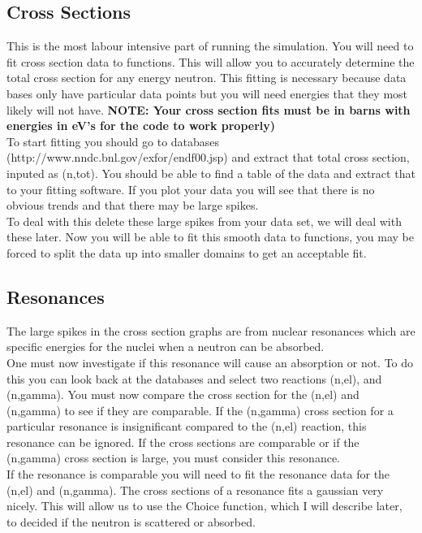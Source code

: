 \documentclass[12pt]{amsart}
\begin{document}
\subsection{Cross Sections}
This is the most labour intensive part of running the simulation. You will need to fit cross section data to functions. This will allow you to accurately determine the total cross section for any energy neutron. This fitting is necessary because data bases only have particular data points but you will need energies that they most likely will not have. \textbf{NOTE: Your cross section fits must be in barns with energies in eV's for the code to work properly)}\\
\indent To start fitting you should go to databases (http://www.nndc.bnl.gov/exfor/endf00.jsp) and extract that total cross section, inputed as (n,tot). You should be able to find a table of the data and extract that to your fitting software. If you plot your data you will see that there is no obvious trends and that there may be large spikes.\\
\indent To deal with this delete these large spikes from your data set, we will deal with these later. Now you will be able to fit this smooth data to functions, you may be forced to split the data up into smaller domains to get an acceptable fit.\\
\subsection{Resonances}
The large spikes in the cross section graphs are from nuclear resonances which are specific energies for the nuclei when a neutron can be absorbed.\\
\indent One must now investigate if this resonance will cause an absorption or not. To do this you can look back at the databases and select two reactions (n,el), and (n,gamma). You must now compare the cross section for the (n,el) and (n,gamma) to see if they are comparable. If the (n,gamma) cross section for a particular resonance is insignificant compared to the (n,el) reaction, this resonance can be ignored. If the cross sections are comparable or if the (n,gamma) cross section is large, you must consider this resonance.\\
\indent If the resonance is comparable you will need to fit the resonance data for the (n,el) and (n,gamma). The cross sections of a resonance fits a gaussian very nicely. This will allow us to use the Choice function, which I will describe later, to decided if the neutron is scattered or absorbed. 
\end{document}
